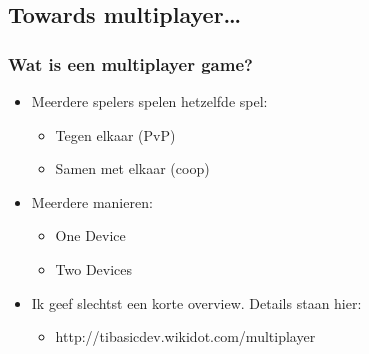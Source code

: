 \subsection{Towards multiplayer\ldots}



\begin{frame}
\frametitle{Wat is een multiplayer game?}

\begin{itemize}
  \item<1-> Meerdere spelers spelen hetzelfde spel:
  \begin{itemize}
    \item<2-> Tegen elkaar (PvP)
    \item<2-> Samen met elkaar (coop)
  \end{itemize}
  \item<3-> Meerdere manieren:
  \begin{itemize}
    \item<4-> One Device
    \item<4-> Two Devices
  \end{itemize}
  \item<5-> Ik geef slechtst een korte overview. Details staan hier:
  \begin{itemize}
    \item<5-> http://tibasicdev.wikidot.com/multiplayer
  \end{itemize}  
\end{itemize}

\end{frame}





